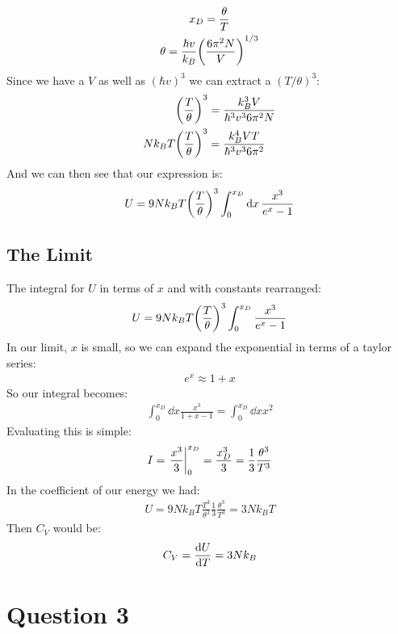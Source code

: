 \documentclass[12pt]{article}
\begin{document}
\begin{gather*}
  x_D=\frac{\theta}{T}\\
  \theta=\frac{\hbar v}{k_B}\qty(\frac{6\pi^2N}{V})^{1/3}
\end{gather*}
Since we have a $V$ as well as $(\hbar v)^3$ we can extract a $(T/\theta)^3$:
\begin{align*}
  \qty(\frac{T}{\theta})^3&=\frac{k_B^3V}{\hbar^3v^36\pi^2N}\\
  Nk_BT\qty(\frac{T}{\theta})^3&=\frac{k_B^4VT}{\hbar^3v^36\pi^2}
\end{align*}
And we can then see that our expression is:
\begin{align*}
  U=9Nk_BT\qty(\frac{T}{\theta})^3\int_0^{x_D}\dd{x}\frac{x^3}{e^{x}-1}
\end{align*}
\fi %
\subsection*{The Limit}
The integral for $U$ in terms of $x$ and with constants rearranged:
\begin{align*}
  U=9Nk_BT\qty(\frac{T}{\theta})^3\int_0^{x_D}\frac{x^3}{e^x-1}
\end{align*}
In our limit, $x$ is small, so we can expand the exponential in terms of a taylor series:
\begin{align*}
  e^x\approx 1+x
\end{align*}
So our integral becomes:
\begin{align*}
  \int_0^{x_D}\dd{x}\frac{x^3}{1+x-1}=\int_0^{x_D}\dd{x}x^2
\end{align*}
Evaluating this is simple:
\begin{align*}
  I=\eval{\frac{x^3}{3}}_0^{x_D}=\frac{x_D^3}{3}=\frac{1}{3}\frac{\theta^3}{T^3}
\end{align*}
In the coefficient of our energy we had:
\begin{align*}
  U=9Nk_BT\frac{T^3}{\theta^3}\frac{1}{3}\frac{\theta^3}{T^3}=3Nk_BT
\end{align*}
Then $C_V$ would be:
\begin{align*}
  C_V=\dv{U}{T}=3Nk_B
\end{align*}
\section*{Question 3}
\end{document}
